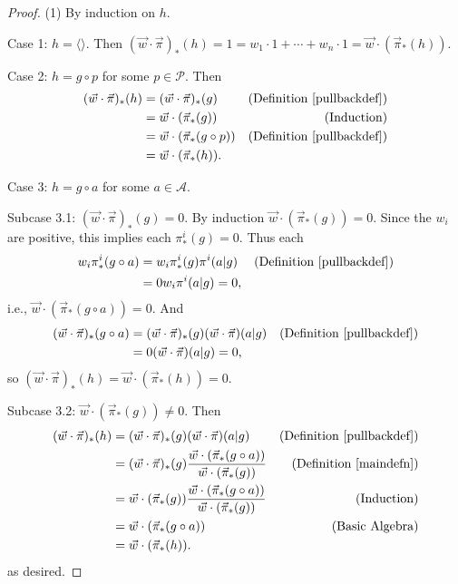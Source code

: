 \documentclass{article}
\begin{document}
\begin{proof}
    (1) By induction on $h$.

    Case 1: $h=\langle\rangle$. Then
    $(\vec w\cdot\vec\pi)_*(h)=1=w_1\cdot 1+\cdots+w_n\cdot 1
    =\vec w\cdot (\vec\pi_*(h))$.

    Case 2: $h=g\circ p$ for some $p\in\mathcal P$. Then
    \begin{align*}
        (\vec w\cdot \vec\pi)_*(h)
            &= (\vec w\cdot\vec\pi)_*(g)
                &\mbox{(Definition \ref{pullbackdef})}\\
            &= \vec w\cdot(\vec\pi_*(g))
                &\mbox{(Induction)}\\
            &= \vec w\cdot(\vec\pi_*(g\circ p))
                &\mbox{(Definition \ref{pullbackdef})}\\
            &= \vec w\cdot(\vec\pi_*(h)).
    \end{align*}

    Case 3: $h=g\circ a$ for some $a\in\mathcal A$.

    Subcase 3.1: $(\vec w\cdot \vec\pi)_*(g)=0$.
        By induction $\vec w\cdot(\vec\pi_*(g))=0$.
        Since the $w_i$ are positive, this implies
        each $\pi^i_*(g)=0$.
        Thus each
        \begin{align*}
            w_i\pi^i_*(g\circ a)
                &= w_i\pi^i_*(g)\pi^i(a|g)
                    &\mbox{(Definition \ref{pullbackdef})}\\
                &= 0w_i\pi^i(a|g)=0,
        \end{align*}
        i.e., $\vec w\cdot(\vec\pi_*(g\circ a))=0$.
        And
        \begin{align*}
            (\vec w\cdot\vec\pi)_*(g\circ a)
                &= (\vec w\cdot\vec\pi)_*(g)(\vec w\cdot\vec\pi)(a|g)
                    &\mbox{(Definition \ref{pullbackdef})}\\
                &= 0(\vec w\cdot\vec\pi)(a|g) = 0,
        \end{align*}
        so $(\vec w\cdot\vec\pi)_*(h)=\vec w\cdot(\vec \pi_*(h))=0$.

    Subcase 3.2: $\vec w\cdot (\vec\pi_*(g))\not=0$. Then
    \begin{align*}
        (\vec w\cdot\vec\pi)_*(h)
            &= (\vec w\cdot\vec\pi)_*(g)(\vec w\cdot\vec\pi)(a|g)
                &\mbox{(Definition \ref{pullbackdef})}\\
            &= (\vec w\cdot\vec\pi)_*(g)
                \frac
                {\vec w\cdot(\vec\pi_*(g\circ a))}
                {\vec w\cdot(\vec\pi_*(g))}
                &\mbox{(Definition \ref{maindefn})}\\
            &= \vec w\cdot(\vec\pi_*(g))
                \frac
                {\vec w\cdot(\vec\pi_*(g\circ a))}
                {\vec w\cdot(\vec\pi_*(g))}
                &\mbox{(Induction)}\\
            &= \vec w\cdot(\vec\pi_*(g\circ a))
                &\mbox{(Basic Algebra)}\\
            &= \vec w\cdot(\vec\pi_*(h)).
    \end{align*}
    as desired.


\end{proof}
\end{document}
